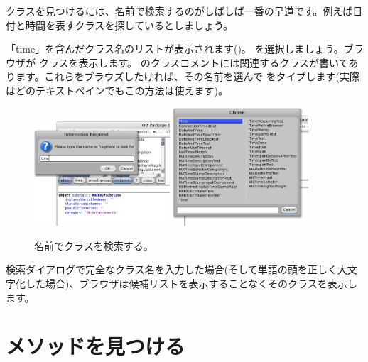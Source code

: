 \documentclass[a4paper,10pt,twoside]{book}
\begin{document}
クラスを見つけるには、名前で検索するのがしばしば一番の早道です。例えば日付と時間を表すクラスを探しているとしましょう。

\noindent
「time」を含んだクラス名のリストが表示されます()。 を選択しましょう。ブラウザが  クラスを表示します。 のクラスコメントには関連するクラスが書いてあります。これらをブラウズしたければ、その名前を選んで  をタイプします(実際はどのテキストペインでもこの方法は使えます)。

\begin{figure}[hbt]
\centerline{
	\includegraphics[width=0.45\textwidth]{FindIt}
	\hspace{1cm}
	\includegraphics[width=0.45\textwidth]{TimeClasses}
}
\caption{名前でクラスを検索する。
}
\end{figure}

検索ダイアログで完全なクラス名を入力した場合(そして単語の頭を正しく大文字化した場合)、ブラウザは候補リストを表示することなくそのクラスを表示します。


\section{メソッドを見つける}
\end{document}
